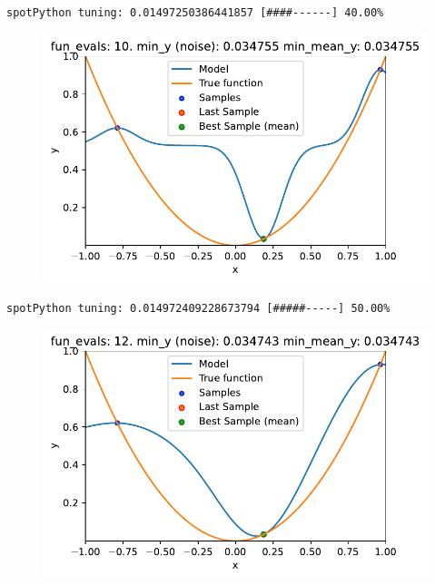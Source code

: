 \documentclass[
  letterpaper,
  DIV=11,
  numbers=noendperiod]{scrreprt}
\begin{document}
\begin{verbatim}
spotPython tuning: 0.01497250386441857 [####------] 40.00% 
\end{verbatim}

\begin{figure}[H]

{\centering \includegraphics{013_num_spot_noisy_files/figure-pdf/cell-10-output-4.pdf}

}

\end{figure}

\begin{verbatim}
spotPython tuning: 0.014972409228673794 [#####-----] 50.00% 
\end{verbatim}

\begin{figure}[H]

{\centering \includegraphics{013_num_spot_noisy_files/figure-pdf/cell-10-output-6.pdf}

}

\end{figure}
\end{document}
